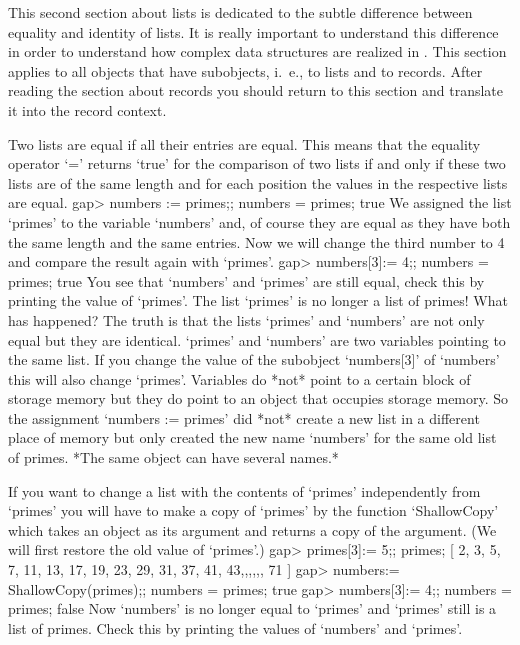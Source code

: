 
This  second section about lists  is  dedicated to  the subtle difference
between  equality and identity  of   lists. It  is  really important   to
understand this  difference in   order  to understand how  complex   data
structures   are realized in {\GAP}.  This  section applies to all {\GAP}
objects that have    subobjects, i.~e., to lists  and   to records. After
reading the section  about records you should  return to this section and
translate it into the record context.

Two  lists are equal if all their entries are equal.  This means that the
equality operator `=' returns `true' for the  comparison of  two lists if
and  only if these two lists are of the same length and for each position
the values in the respective lists are equal.
\beginexample
    gap> numbers := primes;; numbers = primes;
    true 
\endexample
We assigned  the  list `primes' to the variable  `numbers' and, of course
they are equal as they have  both  the same length  and the same entries.
Now we  will change the  third number to  4 and  compare the result again
with `primes'.
\beginexample
    gap> numbers[3]:= 4;; numbers = primes;
    true 
\endexample
You  see that  `numbers' and  `primes'  are still   equal, check this  by
printing the value of `primes'. The list `primes' is  no longer a list of
primes! What has  happened?  The truth is  that  the  lists  `primes' and
`numbers' are  not  only  equal but  they  are  identical.  `primes'  and
`numbers' are two variables pointing to the  same list. If you change the
value of  the subobject `numbers[3]'  of `numbers' this will  also change
`primes'.  Variables do *not* point to  a certain block of storage memory
but they do  point  to an object that  occupies  storage memory.   So the
assignment `numbers := primes' did *not* create a new list in a different
place of memory but only created the new name `numbers'  for the same old
list of primes. *The same object can have several names.*

If you want to change a list with the  contents of `primes' independently
from `primes'  you will have to  make a copy of  `primes' by the function
`ShallowCopy' which takes an object as its argument and returns a copy of
the argument. (We will first restore the old value of `primes'.)
\beginexample
    gap> primes[3]:= 5;; primes;
    [ 2, 3, 5, 7, 11, 13, 17, 19, 23, 29, 31, 37, 41, 43,,,,,, 71 ]
    gap> numbers:= ShallowCopy(primes);; numbers = primes;
    true
    gap> numbers[3]:= 4;; numbers = primes;
    false 
\endexample
Now `numbers' is no longer equal to `primes' and `primes' still is a list
of primes.  Check this by printing the values of `numbers' and `primes'.

